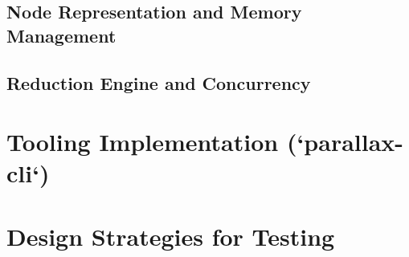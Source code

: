 \subsection{Node Representation and Memory Management}

\subsection{Reduction Engine and Concurrency}

\section{Tooling Implementation (`parallax-cli`)}

\section{Design Strategies for Testing}

